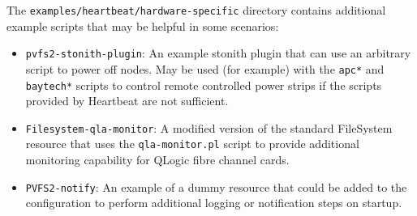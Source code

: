 \documentclass[11pt]{article}
\begin{document}
The \texttt{examples/heartbeat/hardware-specific} directory contains
additional example scripts that may be helpful in some scenarios:

\begin{itemize}
\item \texttt{pvfs2-stonith-plugin}: An example stonith plugin
that can use an arbitrary script to power off nodes.  May be used (for
example) with the \texttt{apc*} and \texttt{baytech*} scripts to control
remote controlled power strips if the scripts provided by Heartbeat are
not sufficient.
\item \texttt{Filesystem-qla-monitor}: A modified version of the
standard FileSystem resource that uses the \texttt{qla-monitor.pl}
script to provide additional monitoring capability for QLogic fibre
channel cards. 
\item \texttt{PVFS2-notify}: An example of a dummy resource that could
be added to the configuration to perform additional logging or
notification steps on startup.
\end{itemize}
\end{document}
